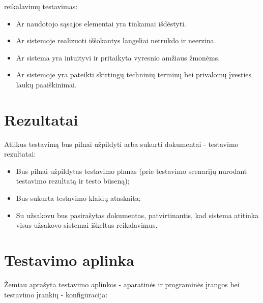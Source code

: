 \documentclass[12pt]{article}
\begin{document}
\begin{itemize}
{    reikalavimų testavimas}:
    \begin{itemize}[label=$\circ$]
        \item Ar naudotojo sąsajos elementai yra tinkamai išdėstyti.
        \item Ar sistemoje realizuoti iššokantys langeliai netrukdo ir neerzina.
        \item Ar sistema yra intuityvi ir pritaikyta vyresnio amžiaus žmonėms.
        \item Ar sistemoje yra pateikti skirtingų techninių terminų bei
        privalomų įvesties laukų paaiškinimai.
    \end{itemize}
\end{itemize}

\newpage


\section{Rezultatai}
Atlikus testavimą bus pilnai užpildyti arba sukurti dokumentai - testavimo
rezultatai:

\begin{itemize}
    \item Bus pilnai užpildytas testavimo planas (prie testavimo scenarijų
    nurodant testavimo rezultatą ir testo būseną);
    \item Bus sukurta testavimo klaidų ataskaita;
    \item Su užsakovu bus pasirašytas dokumentas, patvirtinantis, kad sistema
    atitinka visus užsakovo sistemai iškeltus reikalavimus.
\end{itemize}

\newpage


\section{Testavimo aplinka}
Žemiau aprašyta testavimo aplinkos - aparatinės ir programinės įrangos bei
testavimo įrankių - konfigūracija:
\end{document}
